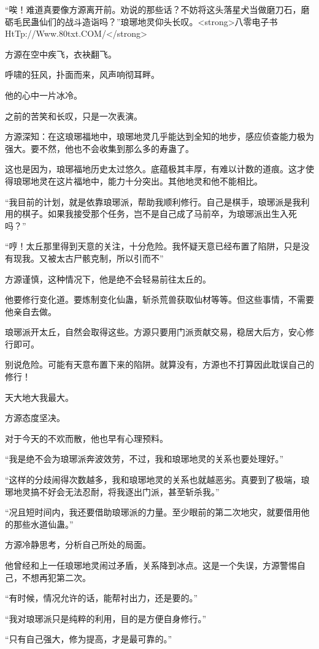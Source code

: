 \begin{this_body}
“唉！难道真要像方源离开前。劝说的那些话？不妨将这头落星犬当做磨刀石，磨砺毛民蛊仙们的战斗造诣吗？”琅琊地灵仰头长叹。<strong>八零电子书HtTp://Www.80txt.COM/</strong>

方源在空中疾飞，衣袂翻飞。

呼啸的狂风，扑面而来，风声响彻耳畔。

他的心中一片冰冷。

之前的苦笑和长叹，只是一次表演。

方源深知：在这琅琊福地中，琅琊地灵几乎能达到全知的地步，感应侦查能力极为强大。要不然，他也不会收集到那么多的寿蛊了。

这也是因为，琅琊福地历史太过悠久。底蕴极其丰厚，有难以计数的道痕。这才使得琅琊地灵在这片福地中，能力十分突出。其他地灵和他不能相比。

“我目前的计划，就是依靠琅琊派，帮助我顺利修行。自己是棋手，琅琊派是我利用的棋子。如果我接受那个任务，岂不是自己成了马前卒，为琅琊派出生入死吗？”

“哼！太丘那里得到天意的关注，十分危险。我怀疑天意已经布置了陷阱，只是没有现我。又被太古尸骸克制，所以引而不”

方源谨慎，这种情况下，他是绝不会轻易前往太丘的。

他要修行变化道。要炼制变化仙蛊，斩杀荒兽获取仙材等等。但这些事情，不需要他亲自去做。

琅琊派开太丘，自然会取得这些。方源只要用门派贡献交易，稳居大后方，安心修行即可。

别说危险。可能有天意布置下来的陷阱。就算没有，方源也不打算因此耽误自己的修行！

天大地大我最大。

方源态度坚决。

对于今天的不欢而散，他也早有心理预料。

“我是绝不会为琅琊派奔波效劳，不过，我和琅琊地灵的关系也要处理好。”

“这样的分歧闹得次数越多，我和琅琊地灵的关系也就越恶劣。真要到了极端，琅琊地灵搞不好会无法忍耐，将我逐出门派，甚至斩杀我。”

“况且短时间内，我还要借助琅琊派的力量。至少眼前的第二次地灾，就要借用他的那些水道仙蛊。”

方源冷静思考，分析自己所处的局面。

他曾经和上一任琅琊地灵闹过矛盾，关系降到冰点。这是一个失误，方源警惕自己，不想再犯第二次。

“有时候，情况允许的话，能帮衬出力，还是要的。”

“我对琅琊派只是纯粹的利用，目的是方便自身修行。”

“只有自己强大，修为提高，才是最可靠的。”


\end{this_body}
